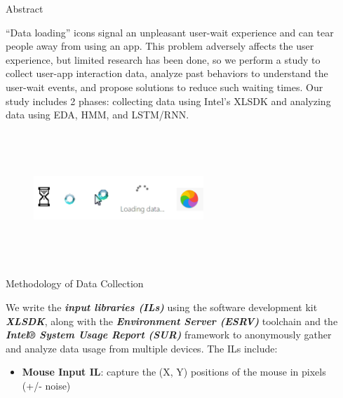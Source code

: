 \documentclass[final]{beamer}
\newlength{\sepwidth}
\newlength{\colwidth}
\newcommand{\separatorcolumn}{\begin{column}{\sepwidth}\end{column}}
\begin{document}
\begin{frame}[t]
  \begin{columns}[t]
    \separatorcolumn

    \begin{column}{\colwidth}

      \begin{block}{\LARGE{Abstract}}

        \large{
          “Data loading” icons signal an unpleasant user-wait experience and can tear people away from using an app.
          This problem adversely affects the user experience, but limited research has been done, so
          we perform a study to collect user-app interaction data, analyze past behaviors to understand the user-wait events,
          and propose solutions to reduce such waiting times.
          Our study includes 2 phases: collecting data using Intel’s XLSDK and analyzing data using EDA, HMM, and LSTM/RNN.}

        \begin{figure}\includegraphics[width=0.6\textwidth, height=5cm]{user_wait.png}\end{figure}

      \end{block}

      \begin{alertblock}{\LARGE{Methodology of Data Collection}}

        \large{We write the \textbf{\textit{input libraries (ILs)}} using the  software development kit \textbf{\textit{XLSDK}}, along with the \textbf{\textit{Environment Server (ESRV)}}  toolchain  and the \textit{ \textbf{Intel® System Usage Report  (SUR)}} framework to anonymously gather and analyze data usage from multiple devices. The ILs include:

          \begin{itemize}
            \item \textbf{Mouse Input IL}: capture the (X, Y) positions of the mouse in pixels (+/- noise)


\end{itemize}}
\end{alertblock}
\end{column}
\end{columns}
\end{frame}
\end{document}
